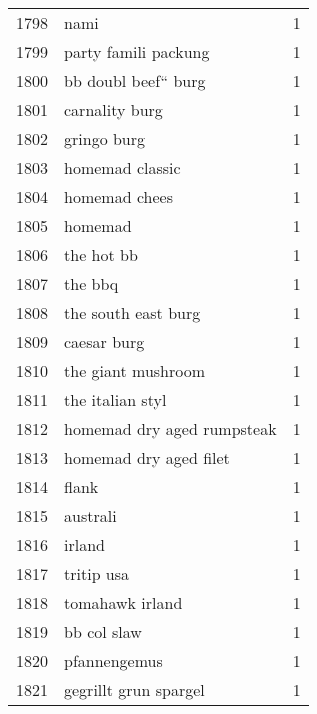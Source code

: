 \begin{tabular}{llr}
1798 &                                               nami &      1 \\
1799 &                               party famili packung &      1 \\
1800 &                                bb doubl beef“ burg &      1 \\
1801 &                                     carnality burg &      1 \\
1802 &                                        gringo burg &      1 \\
1803 &                                    homemad classic &      1 \\
1804 &                                      homemad chees &      1 \\
1805 &                                            homemad &      1 \\
1806 &                                         the hot bb &      1 \\
1807 &                                            the bbq &      1 \\
1808 &                                the south east burg &      1 \\
1809 &                                        caesar burg &      1 \\
1810 &                                 the giant mushroom &      1 \\
1811 &                                   the italian styl &      1 \\
1812 &                         homemad dry aged rumpsteak &      1 \\
1813 &                             homemad dry aged filet &      1 \\
1814 &                                              flank &      1 \\
1815 &                                           australi &      1 \\
1816 &                                             irland &      1 \\
1817 &                                         tritip usa &      1 \\
1818 &                                    tomahawk irland &      1 \\
1819 &                                        bb col slaw &      1 \\
1820 &                                       pfannengemus &      1 \\
1821 &                              gegrillt grun spargel &      1 \\

\end{tabular}
